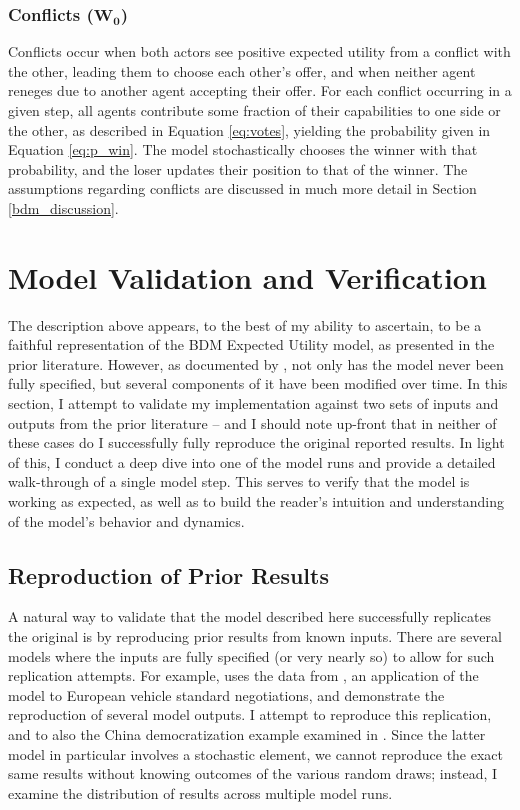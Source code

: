 \subsubsection{Conflicts ($\mathbf{W_0}$)}

Conflicts occur when both actors see positive expected utility from a conflict with the other, leading them to choose each other's offer, and when neither agent reneges due to another agent accepting their offer. For each conflict occurring in a given step, all agents contribute some fraction of their capabilities to one side or the other, as described in Equation \ref{eq:votes}, yielding the probability given in Equation \ref{eq:p_win}. The model stochastically chooses the winner with that probability, and the loser updates their position to that of the winner. The assumptions regarding conflicts are discussed in much more detail in Section \ref{bdm_discussion}.

\section{Model Validation and Verification} \label{model_vv}

The description above appears, to the best of my ability to ascertain, to be a faithful representation of the BDM Expected Utility model, as presented in the prior literature. However, as documented by \citet{scholz_2011}, not only has the model never been fully specified, but several components of it have been modified over time. In this section, I attempt to validate my implementation against two sets of inputs and outputs from the prior literature -- and I should note up-front that in neither of these cases do I successfully fully reproduce the original reported results. In light of this, I conduct a deep dive into one of the model runs and provide a detailed walk-through of a single model step. This serves to verify that the model is working as expected, as well as to build the reader's intuition and understanding of the model's behavior and dynamics.

\subsection{Reproduction of Prior Results} \label{verification}

A natural way to validate that the model described here successfully replicates the original is by reproducing prior results from known inputs. There are several models where the inputs are fully specified (or very nearly so) to allow for such replication attempts. For example, \citet{scholz_2011} uses the data from \citet{bdm_1994}, an application of the model to European vehicle standard negotiations, and demonstrate the reproduction of several model outputs. I attempt to reproduce this replication, and to also the China democratization example examined in \citet[chapter 6]{bdm_2002}. Since the latter model in particular involves a stochastic element, we cannot reproduce the exact same results without knowing outcomes of the various random draws; instead, I examine the distribution of results across multiple model runs. 

